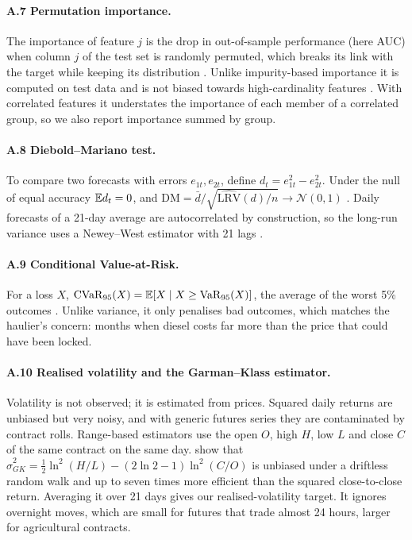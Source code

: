 \paragraph{A.7 Permutation importance.} The importance of feature $j$ is the drop in out-of-sample
performance (here AUC) when column $j$ of the test set is randomly permuted, which breaks its link with the
target while keeping its distribution \citep{fisher2019}. Unlike impurity-based importance it is computed
on test data and is not biased towards high-cardinality features \citep{strobl2007}. With correlated
features it understates the importance of each member of a correlated group, so we also report importance
summed by group.

\paragraph{A.8 Diebold--Mariano test.} To compare two forecasts with errors $e_{1t},e_{2t}$, define
$d_t=e_{1t}^2-e_{2t}^2$. Under the null of equal accuracy $\mathbb{E} d_t=0$, and
$\mathrm{DM}=\bar d/\sqrt{\widehat{\mathrm{LRV}}(d)/n}\to\mathcal N(0,1)$ \citep{diebold1995}. Daily forecasts of a
21-day average are autocorrelated by construction, so the long-run variance uses a Newey--West estimator
with 21 lags \citep{newey1987}.

\paragraph{A.9 Conditional Value-at-Risk.} For a loss $X$, $\mathrm{CVaR}_{95}(X)=\mathbb{E}[X\mid X\ge
\mathrm{VaR}_{95}(X)]$, the average of the worst 5\% outcomes \citep{rockafellar2000}. Unlike variance, it
only penalises bad outcomes, which matches the haulier's concern: months when diesel costs far more than
the price that could have been locked.

\paragraph{A.10 Realised volatility and the Garman--Klass estimator.} Volatility is not observed; it is
estimated from prices. Squared daily returns are unbiased but very noisy, and with generic futures series
they are contaminated by contract rolls. Range-based estimators use the open $O$, high $H$, low $L$ and close
$C$ of the same contract on the same day. \citet{garman1980} show that
$\hat\sigma^2_{GK}=\tfrac12\ln^2(H/L)-(2\ln2-1)\ln^2(C/O)$ is unbiased under a driftless random walk and up to
seven times more efficient than the squared close-to-close return. Averaging it over 21 days gives our
realised-volatility target. It ignores overnight moves, which are small for futures that trade almost 24
hours, larger for agricultural contracts.

